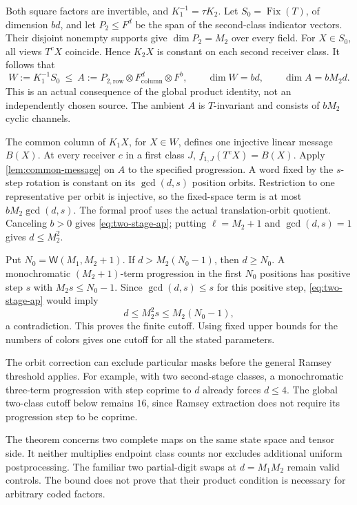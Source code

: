 \begin{outline}
Both square factors are invertible, and $K_1^{-1}=\tau K_2$.
Let $S_0=\operatorname{Fix}(T)$, of dimension $bd$, and let $P_2\le F^d$
be the span of the second-class indicator vectors.  Their disjoint
nonempty supports give $\dim P_2=M_2$ over every field.
For $X\in S_0$, all views $T^cX$ coincide.  Hence $K_2X$ is constant
on each second receiver class.  It follows that
\[
 W:=K_1^{-1}S_0\ \le\
 A:=P_{2,\mathrm{row}}\otimes F^d_{\mathrm{column}}\otimes F^b,
 \qquad \dim W=bd,
 \qquad \dim A=bM_2d.
\]
This is an actual consequence of the global product identity, not an
independently chosen source.  The ambient $A$ is $T$-invariant and consists
of $bM_2$ cyclic channels.

The common column of $K_1X$, for $X\in W$, defines one injective linear
message $B(X)$.  At every receiver $c$ in a first class $J$,
$f_{1,J}(T^cX)=B(X)$.  Apply \cref{lem:common-message} on $A$ to the
specified progression. A word fixed by the $s$-step rotation is constant
on its $\gcd(d,s)$ position orbits. Restriction to one representative per
orbit is injective, so the fixed-space term is at most
$bM_2\gcd(d,s)$. The formal proof uses the actual translation-orbit quotient.
Canceling $b>0$ gives \cref{eq:two-stage-ap}; putting $\ell=M_2+1$ and
$\gcd(d,s)=1$ gives $d\le M_2^2$.

Put $N_0=\mathsf W(M_1,M_2+1)$.  If $d>M_2(N_0-1)$, then
$d\ge N_0$.  A monochromatic $(M_2+1)$-term progression in the first
$N_0$ positions has positive step $s$ with $M_2s\le N_0-1$.
Since $\gcd(d,s)\le s$ for this positive step,
\eqref{eq:two-stage-ap} would imply
\[
 d\le M_2^2s\le M_2(N_0-1),
\]
a contradiction.  This proves the finite cutoff.  Using fixed upper
bounds for the numbers of colors gives one cutoff for all the stated
parameters.
\end{outline}

The orbit correction can exclude particular masks before the general
Ramsey threshold applies. For example, with two second-stage classes,
a monochromatic three-term progression with step coprime to $d$ already
forces $d\le4$. The global two-class cutoff below remains $16$, since
Ramsey extraction does not require its progression step to be coprime.

The theorem concerns two complete maps on the same state space and
tensor side.  It neither multiplies endpoint class counts nor excludes
additional uniform postprocessing.  The familiar two partial-digit
swaps at $d=M_1M_2$ remain valid controls.  The bound does not prove
that their product condition is necessary for arbitrary coded factors.

